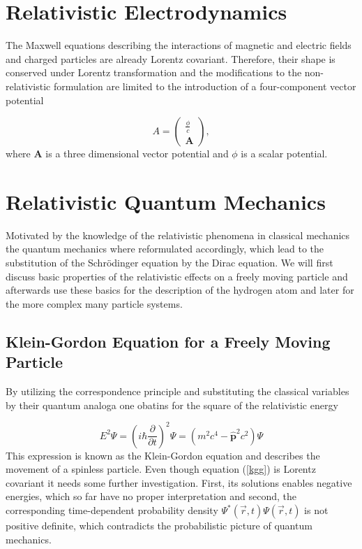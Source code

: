 \section{Relativistic Electrodynamics}
The Maxwell equations describing the interactions of magnetic and electric fields
and charged particles are already Lorentz covariant. Therefore, their shape
is conserved under Lorentz transformation and the modifications to the
non-relativistic formulation are limited to the introduction of a four-component
vector potential

\begin{equation}
A = \begin{pmatrix}\frac{\phi}{c}\\\mathbf{A}\end{pmatrix},
\end{equation}
where $\mathbf{A}$ is a three dimensional vector potential and $\phi$ is a scalar
potential.



\section{Relativistic Quantum Mechanics}
Motivated by the knowledge of the relativistic phenomena in classical mechanics
the quantum mechanics where reformulated accordingly, which lead to the substitution
of the Schrödinger equation by the Dirac equation. We will first discuss basic
properties of the relativistic effects on a freely moving particle and afterwards
use these basics for the description of the hydrogen atom and later for the more
complex many particle systems.

\subsection{Klein-Gordon Equation for a Freely Moving Particle}
By utilizing the correspondence principle and substituting the classical variables
by their quantum analoga one obatins for the square of the relativistic energy



\begin{equation}\label{kgg}
E^2\Psi = \left(i\hbar \frac\partial{\partial t}\right)^2\Psi = \left(m^2c^4-\hat{\mathbf{p}}^2c^2\right) \Psi
\end{equation}
This expression is known as the Klein-Gordon equation and describes the movement of
a spinless particle.\cite{kellogg97}
Even though equation (\ref{kgg}) is Lorentz covariant it needs some further
investigation. First, its solutions enables negative energies, which so far have
no proper interpretation and second, the corresponding time-dependent probability
density $\Psi^*(\vec{r},t)\Psi(\vec{r},t)$ is not positive definite, which
contradicts the probabilistic picture of quantum mechanics.

